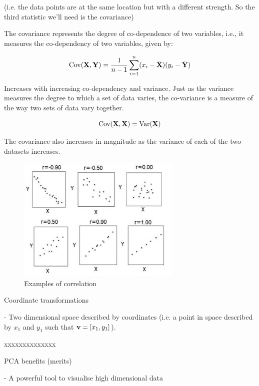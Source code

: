 \documentclass[11pt, oneside]{article}   	%
\begin{document}
(i.e. the data points are at the same location but with a different strength. So the third statistic we'll need is the covariance)

The covariance represents the degree of co-dependence of two variables, i.e., it measures the co-dependency of two variables, given by:

\begin{equation}
   \text{Cov} ({\bf X}, {\bf Y}) = \frac{1}{n-1} \sum_{i=1}^{n} (x_i - \bar{ {\bf X}}) (y_i - \bar{ {\bf Y}})
\end{equation}

Increases with increasing co-dependency and variance. Just as the variance measures the degree to which a set of data varies, the co-variance is a measure of the way two sets of data vary together.

\begin{equation}
   \text{Cov} ({\bf X}, {\bf X}) = \text{Var}({\bf X})
\end{equation}

The covariance also increases in magnitude as the variance of each of the two datasets increases.


\begin{figure}[!h]
	\centering
	\includegraphics[width=0.7\textwidth]{examples-correlation}
	\caption{Examples of correlation}
	\label{fig:MeanVariance}
\end{figure}



Coordinate transformations

- Two dimensional space described by coordinates (i.e. a point in space described by $x_1$ and $y_1$ such that ${\bf v} = [x_1, y_1]$).

xxxxxxxxxxxxxx


PCA benefits (merits)

- A powerful tool to visualise high dimensional data 
\end{document}
